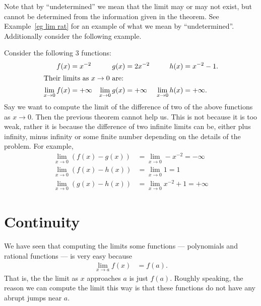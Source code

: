 Note that by ``undetermined'' we mean that the limit may or may not exist, but
cannot be determined from the information given in the theorem. See
Example~\ref{eg lim rat} for an example of what we mean by
``undetermined''. Additionally consider the following example.
\begin{eg}
Consider the following 3 functions:
\begin{align*}
f(x)&=x^{-2} & g(x)&=2x^{-2} &h(x)&=x^{-2}-1. \\
\intertext{Their limits as $x \to 0$ are:}
\lim_{x\to0} f(x) &= +\infty &
\lim_{x\to0} g(x) &= +\infty &
\lim_{x\to0} h(x) &= +\infty.
\end{align*}
Say we want to compute the limit of the difference of two of the above functions as $x
\to 0$. Then the previous theorem cannot help us. This is not because it is too weak,
rather it is because the difference of two infinite limits can be, either plus infinity,
minus infinity or some finite number depending on the details of the problem. For example,
\begin{align*}
  \lim_{x\to0} \left( f(x)-g(x) \right) &= \lim_{x\to0} -x^{-2} = -\infty \\
  \lim_{x\to0} \left( f(x)-h(x) \right) &= \lim_{x\to0} 1 = 1 \\
  \lim_{x\to0} \left( g(x)-h(x) \right) &= \lim_{x\to0} x^{-2}+1 = +\infty
\end{align*}


\end{eg}






\section{Continuity}
We have seen that computing the limits some functions --- polynomials and
rational functions --- is very easy because
\begin{align*}
  \lim_{x \to a} f(x) &= f(a).
\end{align*}
That is, the the limit as $x$ approaches $a$ is just $f(a)$. Roughly speaking,
the reason we can compute the limit this way is that these functions do not
have any abrupt jumps near $a$.


